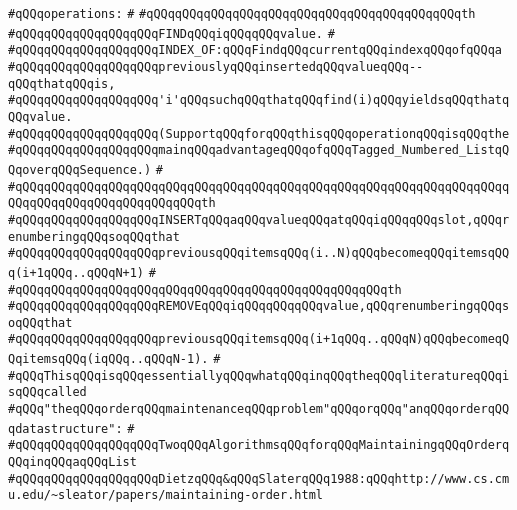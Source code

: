 \verb|#qQQqoperations:|\newline
\verb|#|\newline
\verb|#qQQqqQQqqQQqqQQqqQQqqQQqqQQqqQQqqQQqqQQqqQQqth|\newline
\verb|#qQQqqQQqqQQqqQQqqQQqFINDqQQqiqQQqqQQqvalue.|\newline
\verb|#|\newline
\verb|#qQQqqQQqqQQqqQQqqQQqINDEX_OF:qQQqFindqQQqcurrentqQQqindexqQQqofqQQqa|\newline
\verb|#qQQqqQQqqQQqqQQqqQQqpreviouslyqQQqinsertedqQQqvalueqQQq--qQQqthatqQQqis,|\newline
\verb|#qQQqqQQqqQQqqQQqqQQq'i'qQQqsuchqQQqthatqQQqfind(i)qQQqyieldsqQQqthatqQQqvalue.|\newline
\verb|#qQQqqQQqqQQqqQQqqQQq(SupportqQQqforqQQqthisqQQqoperationqQQqisqQQqthe|\newline
\verb|#qQQqqQQqqQQqqQQqqQQqmainqQQqadvantageqQQqofqQQqTagged_Numbered_ListqQQqoverqQQqSequence.)|\newline
\verb|#|\newline
\verb|#qQQqqQQqqQQqqQQqqQQqqQQqqQQqqQQqqQQqqQQqqQQqqQQqqQQqqQQqqQQqqQQqqQQqqQQqqQQqqQQqqQQqqQQqqQQqqQQqth|\newline
\verb|#qQQqqQQqqQQqqQQqqQQqINSERTqQQqaqQQqvalueqQQqatqQQqiqQQqqQQqslot,qQQqrenumberingqQQqsoqQQqthat|\newline
\verb|#qQQqqQQqqQQqqQQqqQQqpreviousqQQqitemsqQQq(i..N)qQQqbecomeqQQqitemsqQQq(i+1qQQq..qQQqN+1)|\newline
\verb|#|\newline
\verb|#qQQqqQQqqQQqqQQqqQQqqQQqqQQqqQQqqQQqqQQqqQQqqQQqqQQqth|\newline
\verb|#qQQqqQQqqQQqqQQqqQQqREMOVEqQQqiqQQqqQQqqQQqvalue,qQQqrenumberingqQQqsoqQQqthat|\newline
\verb|#qQQqqQQqqQQqqQQqqQQqpreviousqQQqitemsqQQq(i+1qQQq..qQQqN)qQQqbecomeqQQqitemsqQQq(iqQQq..qQQqN-1).|\newline
\verb|#|\newline
\verb|#qQQqThisqQQqisqQQqessentiallyqQQqwhatqQQqinqQQqtheqQQqliteratureqQQqisqQQqcalled|\newline
\verb|#qQQq"theqQQqorderqQQqmaintenanceqQQqproblem"qQQqorqQQq"anqQQqorderqQQqdatastructure":|\newline
\verb|#|\newline
\verb|#qQQqqQQqqQQqqQQqqQQqTwoqQQqAlgorithmsqQQqforqQQqMaintainingqQQqOrderqQQqinqQQqaqQQqList|\newline
\verb|#qQQqqQQqqQQqqQQqqQQqDietzqQQq&qQQqSlaterqQQq1988:qQQqhttp://www.cs.cmu.edu/~sleator/papers/maintaining-order.html|\newline
